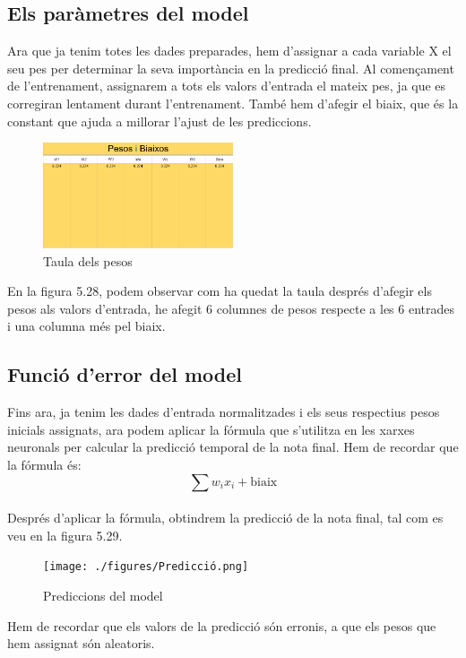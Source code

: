 \subsection{Els paràmetres del model}
Ara que ja tenim totes les dades preparades, hem d'assignar a cada variable X el seu pes per determinar la seva importància en la predicció final. Al començament de l'entrenament, assignarem a tots els valors d'entrada el mateix pes, ja que es corregiran lentament durant l'entrenament.
També hem d'afegir el biaix, que és la constant que ajuda a millorar l'ajust de les prediccions.

\begin{figure}[H]
    \centering
    \includegraphics[width=0.5\textwidth]{./figures/Pesos.png}
    \caption{Taula dels pesos}
\end{figure}

En la figura 5.28, podem observar com ha quedat la taula després d'afegir els pesos als valors d'entrada, he afegit 6 columnes de pesos respecte a les 6 entrades i una columna més pel biaix.

\subsection{Funció d'error del model}
Fins ara, ja tenim les dades d'entrada normalitzades i els seus respectius pesos inicials assignats, ara podem aplicar la fórmula que s'utilitza en les xarxes neuronals per calcular la predicció temporal de la nota final. Hem de recordar que la fórmula és:\\
\[
\sum w_i x_i + \text{biaix}
\] \\
Després d'aplicar la fórmula, obtindrem la predicció de la nota final, tal com es veu en la figura 5.29.

\begin{figure}[H]
    \centering
    \texttt{[image: ./figures/Predicció.png]}
    \caption{Prediccions del model}
 \end{figure}

Hem de recordar que els valors de la predicció són erronis, a que els pesos que hem assignat són aleatoris.

